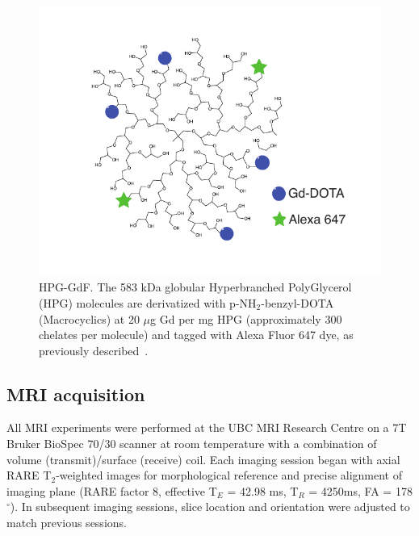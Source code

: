 \begin{figure}[htbp]
 \begin{center}
 \includegraphics[width=\textwidth]{hpg/hpg-paper1-images/hpg_fig1-hpgdf.pdf}
 \caption{\acs{HPG-GdF}. The 583  \acs{kDa} globular Hyperbranched PolyGlycerol (HPG) molecules are derivatized with p-NH$_2$-benzyl-DOTA (Macrocyclics) at 20 $\mu$g Gd per mg HPG (approximately 300 chelates per molecule) and tagged with Alexa Fluor 647 dye, as previously described~\cite{Saatchi:2012hc}.}
 \label{hpgpaper1:fig1}
 \end{center}
\end{figure}

\subsection{MRI acquisition}
All MRI experiments were performed at the UBC MRI Research Centre on a 7T Bruker BioSpec 70/30 scanner at room temperature with a combination of volume (transmit)/surface (receive) coil.
Each imaging session began with axial \acs{RARE} T$_2$-weighted images for morphological reference and precise alignment of imaging plane (RARE factor 8, effective T$_E$ = 42.98 ms, T$_R$ = 4250ms, FA = 178$^{\circ}$).
In subsequent imaging sessions, slice location and orientation were adjusted to match previous sessions.

